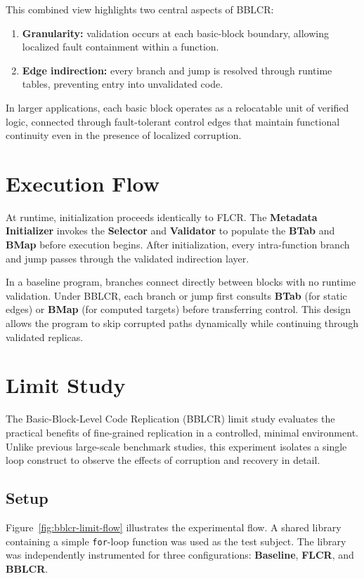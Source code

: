 This combined view highlights two central aspects of BBLCR:
\begin{enumerate}
  \item \textbf{Granularity:} validation occurs at each basic-block boundary,
        allowing localized fault containment within a function.
  \item \textbf{Edge indirection:} every branch and jump is resolved through runtime
        tables, preventing entry into unvalidated code.
\end{enumerate}

In larger applications, each basic block operates as a relocatable unit of verified logic,
connected through fault-tolerant control edges that maintain functional continuity
even in the presence of localized corruption.

\section*{Execution Flow}
At runtime, initialization proceeds identically to FLCR.
The \textbf{Metadata Initializer} invokes the \textbf{Selector} and \textbf{Validator}
to populate the \textbf{BTab} and \textbf{BMap} before execution begins.
After initialization, every intra-function branch and jump passes through the validated indirection layer.

In a baseline program, branches connect directly between blocks with no runtime validation.
Under BBLCR, each branch or jump first consults \textbf{BTab} (for static edges)
or \textbf{BMap} (for computed targets) before transferring control.
This design allows the program to skip corrupted paths dynamically while continuing
through validated replicas.

\section*{Limit Study}
The Basic-Block-Level Code Replication (BBLCR) limit study evaluates the practical
benefits of fine-grained replication in a controlled, minimal environment.
Unlike previous large-scale benchmark studies, this experiment isolates a single
loop construct to observe the effects of corruption and recovery in detail.

\subsection*{Setup}
Figure~\ref{fig:bblcr-limit-flow} illustrates the experimental flow.
A shared library containing a simple \texttt{for}-loop function was used as the test
subject.  The library was independently instrumented for three configurations:
\textbf{Baseline}, \textbf{FLCR}, and \textbf{BBLCR}.

